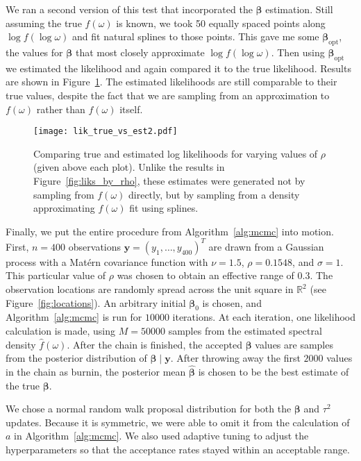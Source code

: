 We ran a second version of this test that incorporated the $\bm{\beta}$ estimation. Still assuming the true $f(\omega)$ is known, we took 50 equally spaced points along $\log f(\log \omega)$ and fit natural splines to those points. This gave me some $\bm{\beta}_{\textrm{opt}}$, the values for $\bm{\beta}$ that most closely approximate $\log f(\log \omega)$. Then using $\bm{\beta}_{\textrm{opt}}$ we estimated the likelihood and again compared it to the true likelihood. Results are shown in Figure~\ref{fig:estliks_spline_rho}. The estimated likelihoods are still comparable to their true values, despite the fact that we are sampling from an approximation to $f(\omega)$ rather than $f(\omega)$ itself.

\begin{figure}[!htb]
	\centering
	\texttt{[image: lik\_true\_vs\_est2.pdf]}
	\caption{\small Comparing true and estimated log likelihoods for varying values of $\rho$ (given above each plot). Unlike the results in Figure~\ref{fig:liks_by_rho}, these estimates were generated not by sampling from $f(\omega)$ directly, but by sampling from a density approximating $f(\omega)$ fit using splines.}
	\label{fig:estliks_spline_rho}
\end{figure}

Finally, we put the entire procedure from Algorithm~\ref{alg:mcmc} into motion. First, $n = 400$ observations $\bm{y} = (y_1, \dots, y_{400})^T$ are drawn from a Gaussian process with a Mat\'{e}rn covariance function with $\nu = 1.5$, $\rho = 0.1548$, and $\sigma = 1$. This particular value of $\rho$ was chosen to obtain an effective range of 0.3. The observation locations are randomly spread across the unit square in $\mathbb{R}^2$ (see Figure~\ref{fig:locations}). An arbitrary initial $\bm{\beta}_0$ is chosen, and Algorithm~\ref{alg:mcmc} is run for $10000$ iterations. At each iteration, one likelihood calculation is made, using $M = 50000$ samples from the estimated spectral density $\hat{f}(\omega)$. After the chain is finished, the accepted $\bm{\beta}$ values are samples from the posterior distribution of $\bm{\beta} \;|\; \bm{y}$. After throwing away the first $2000$ values in the chain as burnin, the posterior mean $\widehat{\bm{\beta}}$ is chosen to be the best estimate of the true $\bm{\beta}$.

We chose a normal random walk proposal distribution for both the $\bm{\beta}$ and $\tau^2$ updates. Because it is symmetric, we were able to omit it from the calculation of $a$ in Algorithm~\ref{alg:mcmc}. We also used adaptive tuning to adjust the hyperparameters so that the acceptance rates stayed within an acceptable range.

